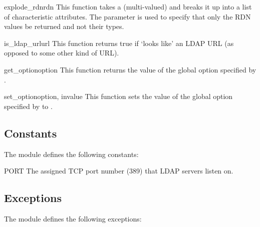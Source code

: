 \begin{funcdesc}{explode_rdn}{rdn } %
  This function takes a (multi-valued)  and breaks it up
  into a list of characteristic attributes. The
   parameter is used to specify that only the RDN values be 
  returned and not their types.
\end{funcdesc}

\begin{funcdesc}{is_ldap_url}{url} %
  This function returns true if  `looks like' an LDAP URL 
  (as opposed to some other kind of URL). 
\end{funcdesc}

\begin{funcdesc}{get_option}{option} %
  This function returns the value of the global option
  specified by .
\end{funcdesc}

\begin{funcdesc}{set_option}{option, invalue} %
  This function sets the value of the global option
  specified by  to .
\end{funcdesc}



\subsection{Constants}

The module defines the following constants:

\begin{datadesc}{PORT}
  The assigned TCP port number (389) that LDAP servers listen on.
\end{datadesc}


\subsection{Exceptions}
\label{subsec:exceptfrommeth}

The module defines the following exceptions:

